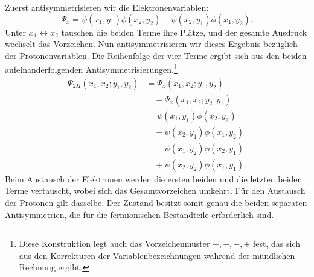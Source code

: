 Zuerst antisymmetrisieren wir die Elektronenvariablen:
\begin{equation}
\Psi_x=
\psi(x_1,y_1)\phi(x_2,y_2)
-\psi(x_2,y_1)\phi(x_1,y_2).
\end{equation}
Unter \(x_1\leftrightarrow x_2\) tauschen die beiden Terme ihre Plätze, und der gesamte Ausdruck wechselt das Vorzeichen. Nun antisymmetrisieren wir dieses Ergebnis bezüglich der Protonenvariablen. Die Reihenfolge der vier Terme ergibt sich aus den beiden aufeinanderfolgenden Antisymmetrisierungen.\footnote{Diese Konstruktion legt auch das Vorzeichenmuster \(+,-,-,+\) fest, das sich aus den Korrekturen der Variablenbezeichnungen während der mündlichen Rechnung ergibt.}
\begin{align}
\Psi_{2H}(x_1,x_2;y_1,y_2)
&=\Psi_x(x_1,x_2;y_1,y_2)\nonumber\\
&\quad{}-\Psi_x(x_1,x_2;y_2,y_1)\\
&=\psi(x_1,y_1)\phi(x_2,y_2)\nonumber\\
&\quad{}-\psi(x_2,y_1)\phi(x_1,y_2)\nonumber\\
&\quad{}-\psi(x_1,y_2)\phi(x_2,y_1)\nonumber\\
&\quad{}+\psi(x_2,y_2)\phi(x_1,y_1).
\label{eq:two-hydrogen-antisymmetrized}
\end{align}
Beim Austausch der Elektronen werden die ersten beiden und die letzten beiden Terme vertauscht, wobei sich das Gesamtvorzeichen umkehrt. Für den Austausch der Protonen gilt dasselbe. Der Zustand besitzt somit genau die beiden separaten Antisymmetrien, die für die fermionischen Bestandteile erforderlich sind.

\begin{classroomqa}
\end{classroomqa}

